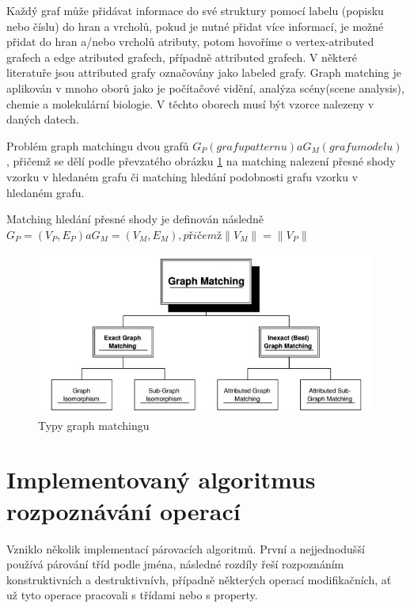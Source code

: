 \documentclass[11pt,twoside,a4paper]{book}
\begin{document}
 Každý graf může přidávat informace do své struktury pomocí labelu (popisku
 nebo číslu) do hran a vrcholů, pokud je nutné přidat více informací, je možné
 přidat do hran a/nebo vrcholů atributy, potom hovoříme o vertex-atributed
 grafech a edge atributed grafech, případně attributed grafech. V některé
 literatuře jsou attributed grafy označovány jako labeled grafy. Graph
 matching je aplikován v mnoho oborů jako je počítačové vidění, analýza
 scény(scene analysis), chemie a molekulární biologie. V těchto oborech musí být
 vzorce nalezeny v daných datech. 
  
 Problém graph matchingu dvou grafů $G_P (grafu patternu) a G_M (grafu modelu)$,
 přičemž se dělí podle převzatého obrázku \ref{fig:graph_matching} na matching nalezení přesné shody vzorku v hledaném
 grafu či matching hledání podobnosti grafu vzorku v hledaném grafu. 
 
 Matching hledání přesné shody je definován následně $G_P = (V_P , E_P) a G_M = (V_M, E_M), přičemž \| V_M\| = \| V_P\|$
 
 
 \begin{figure}[ht]
\begin{center}
\includegraphics[width=15cm]{figures/graph_matching.jpg}
\caption{Typy graph matchingu}
\label{fig:graph_matching}
\end{center}
\end{figure}
 
 
 \section{Implementovaný algoritmus rozpoznávání operací}
 
 Vzniklo několik implementací párovacích algoritmů. První a nejjednodušší
 používá párování tříd podle jména, následné rozdíly řeší rozpoznáním
 konstruktivních a destruktivnívh, případně některých operací modifikačních, ať
 už tyto operace pracovali s třídami nebo s property.
 
\end{document}
